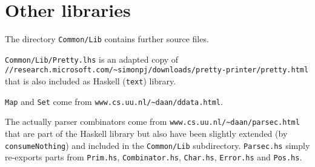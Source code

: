 \documentclass{article}
\begin{document}
\section{Other libraries}

The directory \texttt{Common/Lib} contains further source files.

\texttt{Common/Lib/Pretty.lhs} is an adapted copy of\\
\texttt{//research.microsoft.com/\~{}simonpj/downloads/pretty-printer/pretty.html}
that is also included as Haskell (\texttt{text}) library. 

\texttt{Map} and \texttt{Set}
come from \texttt{www.cs.uu.nl/\~{}daan/ddata.html}.

The actually parser combinators come from 
\texttt{www.cs.uu.nl/\~{}daan/parsec.html} that are part of the
Haskell library but also have been slightly extended (by
\texttt{consumeNothing}) and included in the \texttt{Common/Lib}
subdirectory. \texttt{Parsec.hs} simply re-exports parts from
\texttt{Prim.hs}, \texttt{Combinator.hs},
\texttt{Char.hs}, \texttt{Error.hs} and
\texttt{Pos.hs}. 
\end{document}
